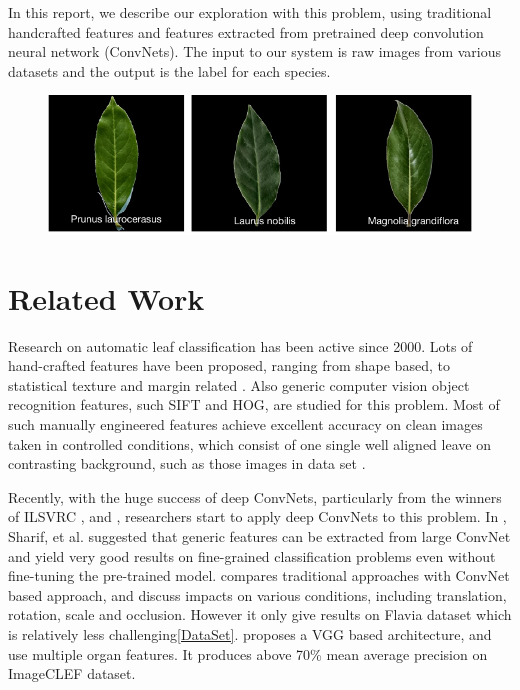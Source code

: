 \documentclass[journal, 10pt]{IEEEtran}
\begin{document}
In this report, we describe our exploration with this problem, using traditional handcrafted features and features extracted from pretrained deep convolution neural network (ConvNets). The input to our system is raw images from various datasets and the output is the label for each species.

\begin{figure}[H]
  \centering
  \includegraphics[width=0.8\linewidth]{easilyconfused}
\end{figure}


\section{Related Work}
Research on automatic leaf classification has been active since 2000. Lots of hand-crafted features have been proposed, ranging from shape based, to statistical texture and margin related \cite{Charles13} \cite{Pedro13} \cite{Cho2002}. Also generic computer vision object recognition features, such SIFT\cite{SIFT} and HOG\cite{HOG}, are studied for this problem.  Most of such manually engineered features achieve excellent accuracy on clean images taken in controlled conditions, which consist of one single well aligned leave on contrasting background, such as those images in data set \cite{SwedishLeafDataset}.

Recently, with the huge success of deep ConvNets, particularly from the winners of ILSVRC \cite{Alex2014} \cite{VGGNetReference}, \cite{GoogleNetReference} and \cite{ResNet}, researchers start to apply deep ConvNets to this problem.  In \cite{CNNOfTheShelf}, Sharif, et al. suggested that generic features can be extracted from large ConvNet and yield very good results on fine-grained classification problems even without fine-tuning the pre-trained model. \cite{EvaluationOfLeafConv} compares traditional approaches with ConvNet based approach, and discuss impacts on various conditions, including translation, rotation, scale and occlusion. However it only give results on Flavia\cite{FlaviaDataset} dataset which is relatively less challenging\ref{DataSet}. \cite{PlantIdentificationConv} proposes a VGG\cite{VGGNetReference} based architecture, and use multiple organ features. It produces above 70\% mean average precision on ImageCLEF dataset\cite{ImageCLEF2013}.
\end{document}
